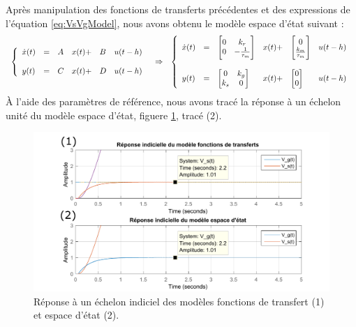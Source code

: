 Après manipulation des fonctions de transferts précédentes et des expressions de l'équation \ref{eq:VsVgModel}, nous avons obtenu le modèle espace d'état suivant : 
\begin{equation}
\label{eq:EE}
\begin{array}{lcl}

\left\lbrace
\begin{array}{l c l c lc}
\dot{x}(t) 
&=& 
A&
x(t) +& 
B &u(t-h)\\
&&&&\\

y(t) 
&=& 
C&
x(t) +& 
D &u(t-h)\\
\end{array}
\right. 

& \Rightarrow &

\left\lbrace
\begin{array}{l c l c lc}
\dot{x}(t) 
&=& 
\begin{bmatrix}
0	&	k_r\\
0	&	-\frac{1}{\tau_m}
\end{bmatrix}&
x(t) +& 
\begin{bmatrix}
0 \\
\frac{k_m}{\tau_m}
\end{bmatrix} &u(t-h)\\
&&&&\\

y(t) 
&=& 
\begin{bmatrix}
0	&	k_g\\
k_s	&	0
\end{bmatrix}&
x(t) +& 
\begin{bmatrix}
0 \\
0
\end{bmatrix} &u(t-h)\\
\end{array}

\right.
\end{array}
\end{equation}
À l'aide des paramètres de référence, nous avons tracé la réponse à un échelon unité du modèle espace d'état, figuere \ref{fig:repIndiFTsEE}, tracé (2).
\begin{figure}[!ht]
\centering
\includegraphics[width=.7\textwidth]{./I/images/modeles_ft-ee.pdf}
\caption{\label{fig:repIndiFTsEE}Réponse à un échelon indiciel des modèles fonctions de transfert (1) et espace d'état (2).}
\end{figure}

